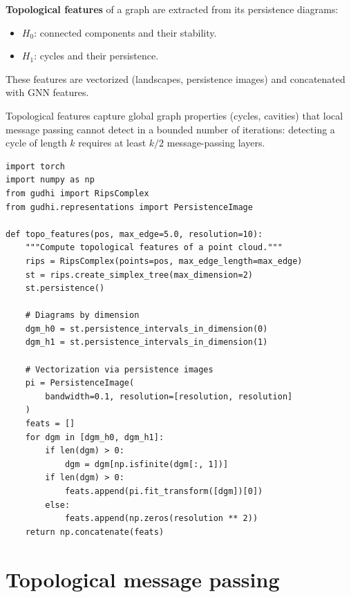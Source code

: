 \begin{definition}
\textbf{Topological features} of a graph are extracted from its
persistence diagrams:
\begin{itemize}
  \item $H_0$: connected components and their stability.
  \item $H_1$: cycles and their persistence.
\end{itemize}
These features are vectorized (landscapes, persistence images) and
concatenated with GNN features.
\end{definition}

\begin{proposition}[Complementarity]
Topological features capture global graph properties (cycles,
cavities) that local message passing cannot detect in a bounded
number of iterations: detecting a cycle of length $k$ requires
at least $k/2$ message-passing layers.
\end{proposition}

\begin{verbatim}
import torch
import numpy as np
from gudhi import RipsComplex
from gudhi.representations import PersistenceImage

def topo_features(pos, max_edge=5.0, resolution=10):
    """Compute topological features of a point cloud."""
    rips = RipsComplex(points=pos, max_edge_length=max_edge)
    st = rips.create_simplex_tree(max_dimension=2)
    st.persistence()

    # Diagrams by dimension
    dgm_h0 = st.persistence_intervals_in_dimension(0)
    dgm_h1 = st.persistence_intervals_in_dimension(1)

    # Vectorization via persistence images
    pi = PersistenceImage(
        bandwidth=0.1, resolution=[resolution, resolution]
    )
    feats = []
    for dgm in [dgm_h0, dgm_h1]:
        if len(dgm) > 0:
            dgm = dgm[np.isfinite(dgm[:, 1])]
        if len(dgm) > 0:
            feats.append(pi.fit_transform([dgm])[0])
        else:
            feats.append(np.zeros(resolution ** 2))
    return np.concatenate(feats)
\end{verbatim}

\section{Topological message passing}
\label{sec:topo_message_passing}

